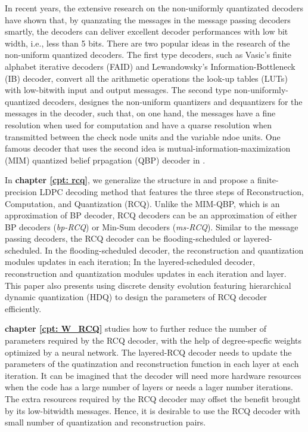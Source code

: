\documentclass [PhD] {uclathes}
\begin{document}
In recent years, the extensive research on the non-uniformly quantizated decoders have shown that, by quanzating the messages in the message passing decoders smartly, the decoders can deliver excellent decoder performances with low bit width, i.e., less than 5 bits. There are two popular ideas in the research of the non-uniform quantized decoders. The first type decoders, such as Vasic's finite alphabet iterative decoders (FAID) and Lewandowsky's Information-Bottleneck (IB) decoder, convert all the arithmetic operations the look-up tables (LUTs) with low-bitwith input and output messages. The second type non-uniformly-quantized decoders, designes the non-uniform quantizers and dequantizers for the messages in the decoder, such that, on one hand, the messages have a fine resolution when used for computation and have a quarse resolution when transmitted between the check node units and the variable ndoe units. One famous decoder that uses the second idea is mutual-information-maximization (MIM) quantized belief prpagation (QBP) decoder in \cite{-_Lee2005-MIMQBP}. 

In \textbf{chapter \ref{cpt: rcq}}, we generalize the structure in \cite{Lee2005-RFQThorpe} and propose a finite-precision LDPC decoding method that features the three steps of Reconstruction, Computation, and Quantization (RCQ). Unlike the MIM-QBP, which is an approximation of BP decoder, RCQ decoders can be an approximation of either BP decoders (\textit{bp-RCQ}) or Min-Sum decoders (\textit{ms-RCQ}). Similar to the message passing decoders, the RCQ decoder can be flooding-scheduled or layered-scheduled. In the flooding-scheduled decoder, the reconstruction and quantization modules updates in each iteration; In the layered-scheduled decoder, reconstruction and quantization modules updates in each iteration and layer. This paper also presents using discrete density evolution featuring hierarchical dynamic quantization (HDQ) to design the parameters of RCQ decoder efficiently.

\textbf{chapter \ref{cpt: W_RCQ}} studies how to further reduce the number of parameters required by the RCQ decoder, with the help of degree-specfic weights optimized by a neural network. The layered-RCQ decoder needs to update the parameters of the quatinzation and reconstruction function in each layer at each iteration. It can be imagined that the decoder will need more hardware resources when the code has a large number of layers or needs a lager number iterations. The extra resources required by the RCQ decoder may offset the benefit brought by its low-bitwidth messages. Hence, it is desirable to use the RCQ decoder with small number of quantization and reconstruction pairs. 
\end{document}
